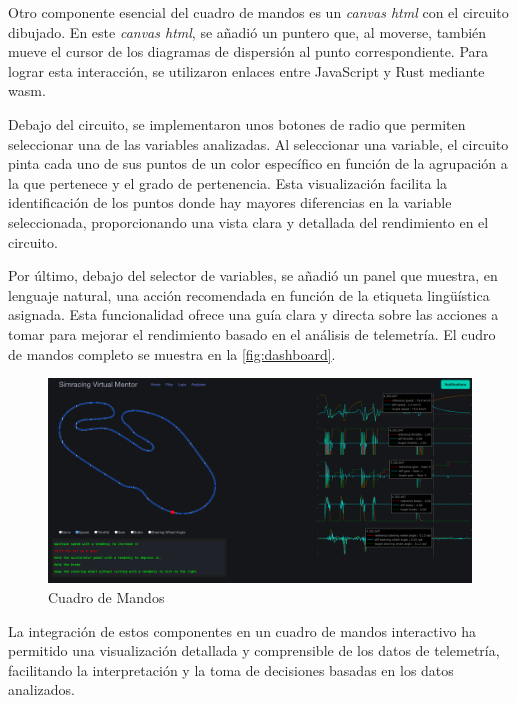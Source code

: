 Otro componente esencial del cuadro de mandos es un \textit{canvas \ac{html}} con el circuito dibujado. En este \textit{canvas \ac{html}}, se añadió un puntero que, al moverse, también mueve el cursor de los diagramas de dispersión al punto correspondiente. Para lograr esta interacción, se utilizaron enlaces entre JavaScript y Rust mediante \ac{wasm}.

Debajo del circuito, se implementaron unos botones de radio que permiten seleccionar una de las variables analizadas. Al seleccionar una variable, el circuito pinta cada uno de sus puntos de un color específico en función de la agrupación a la que pertenece y el grado de pertenencia. Esta visualización facilita la identificación de los puntos donde hay mayores diferencias en la variable seleccionada, proporcionando una vista clara y detallada del rendimiento en el circuito.

Por último, debajo del selector de variables, se añadió un panel que muestra, en lenguaje natural, una acción recomendada en función de la etiqueta lingüística asignada. Esta funcionalidad ofrece una guía clara y directa sobre las acciones a tomar para mejorar el rendimiento basado en el análisis de telemetría. El cudro de mandos completo se muestra en la \autoref{fig:dashboard}.
\begin{figure}[H]
\centering
\includegraphics[width=1\linewidth]{./figs/herramientas/desarrollo/svm.png}
\caption[Cuadro de Mandos]{Cuadro de Mandos}
\label{fig:dashboard}
\end{figure}

La integración de estos componentes en un cuadro de mandos interactivo ha permitido una visualización detallada y comprensible de los datos de telemetría, facilitando la interpretación y la toma de decisiones basadas en los datos analizados.